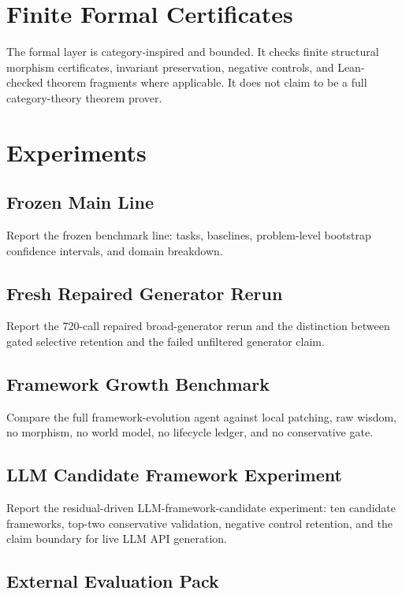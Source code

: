 \documentclass[11pt]{article}
\begin{document}
\section{Finite Formal Certificates}

The formal layer is category-inspired and bounded.  It checks finite structural
morphism certificates, invariant preservation, negative controls, and Lean-
checked theorem fragments where applicable.  It does not claim to be a full
category-theory theorem prover.

\section{Experiments}

\subsection{Frozen Main Line}

Report the frozen benchmark line: tasks, baselines, problem-level bootstrap
confidence intervals, and domain breakdown.

\subsection{Fresh Repaired Generator Rerun}

Report the 720-call repaired broad-generator rerun and the distinction between
gated selective retention and the failed unfiltered generator claim.

\subsection{Framework Growth Benchmark}

Compare the full framework-evolution agent against local patching, raw wisdom,
no morphism, no world model, no lifecycle ledger, and no conservative gate.

\subsection{LLM Candidate Framework Experiment}

Report the residual-driven LLM-framework-candidate experiment: ten candidate
frameworks, top-two conservative validation, negative control retention, and the
claim boundary for live LLM API generation.

\subsection{External Evaluation Pack}
\end{document}
